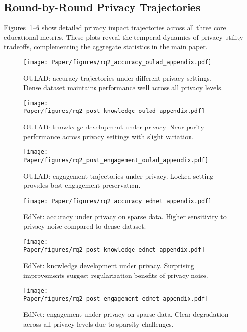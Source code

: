 \subsection{Round-by-Round Privacy Trajectories}

Figures~\ref{fig:rq2-acc-privacy-oulad-app}--\ref{fig:rq2-eng-privacy-ednet-app} show detailed privacy impact trajectories across all three core educational metrics. These plots reveal the temporal dynamics of privacy-utility tradeoffs, complementing the aggregate statistics in the main paper.

\begin{figure}[!t]
  \centering
  \texttt{[image: Paper/figures/rq2\_accuracy\_oulad\_appendix.pdf]}
  \caption{OULAD: accuracy trajectories under different privacy settings. Dense dataset maintains performance well across all privacy levels.}
  \label{fig:rq2-acc-privacy-oulad-app}
\end{figure}

\begin{figure}[!t]
  \centering
  \texttt{[image: Paper/figures/rq2\_post\_knowledge\_oulad\_appendix.pdf]}
  \caption{OULAD: knowledge development under privacy. Near-parity performance across privacy settings with slight variation.}
  \label{fig:rq2-know-privacy-oulad-app}
\end{figure}

\begin{figure}[!t]
  \centering
  \texttt{[image: Paper/figures/rq2\_post\_engagement\_oulad\_appendix.pdf]}
  \caption{OULAD: engagement trajectories under privacy. Locked setting provides best engagement preservation.}
  \label{fig:rq2-eng-privacy-oulad-app}
\end{figure}

\begin{figure}[!t]
  \centering
  \texttt{[image: Paper/figures/rq2\_accuracy\_ednet\_appendix.pdf]}
  \caption{EdNet: accuracy under privacy on sparse data. Higher sensitivity to privacy noise compared to dense dataset.}
  \label{fig:rq2-acc-privacy-ednet-app}
\end{figure}

\begin{figure}[!t]
  \centering
  \texttt{[image: Paper/figures/rq2\_post\_knowledge\_ednet\_appendix.pdf]}
  \caption{EdNet: knowledge development under privacy. Surprising improvements suggest regularization benefits of privacy noise.}
  \label{fig:rq2-know-privacy-ednet-app}
\end{figure}

\begin{figure}[!t]
  \centering
  \texttt{[image: Paper/figures/rq2\_post\_engagement\_ednet\_appendix.pdf]}
  \caption{EdNet: engagement under privacy on sparse data. Clear degradation across all privacy levels due to sparsity challenges.}
  \label{fig:rq2-eng-privacy-ednet-app}
\end{figure}
